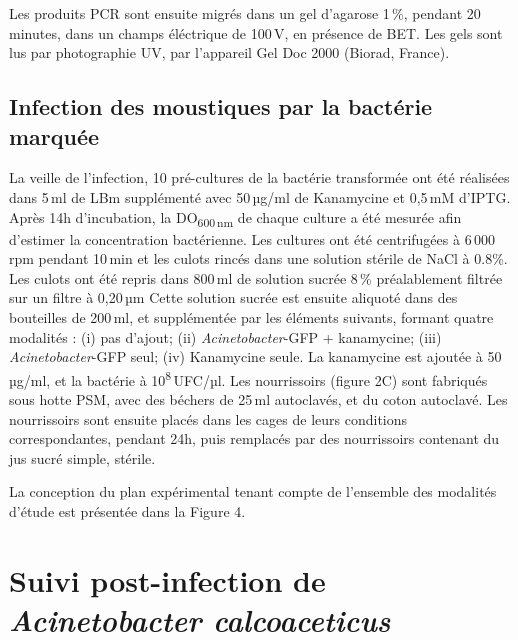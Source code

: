 Les produits PCR sont ensuite migrés dans un gel d'agarose 1\,\%, pendant 20 minutes, dans un champs éléctrique de 100\,V, en présence de BET.
Les gels sont lus par photographie UV, par l'appareil Gel Doc 2000 (Biorad, France).

\subsection{Infection des moustiques par la bactérie marquée}

La veille de l’infection, 10 pré-cultures de la bactérie transformée ont été réalisées dans 5\,ml de LBm supplémenté avec 50\,µg/ml de Kanamycine et 0,5\,mM d'IPTG.
Après 14h d'incubation, la DO\textsubscript{600\,nm} de chaque culture a été mesurée afin d'estimer la concentration bactérienne.
Les cultures ont été centrifugées à 6\,000\,rpm pendant 10\,min et les culots rincés dans une solution stérile de NaCl à 0.8\%.
Les culots ont été repris dans 800\,ml de solution sucrée 8\,\% préalablement filtrée sur un filtre à 0,20\,µm
Cette solution sucrée est ensuite aliquoté dans des bouteilles de 200\,ml, et supplémentée par les éléments suivants, formant quatre modalités :
(i) pas d'ajout; (ii) \textit{Acinetobacter}-GFP + kanamycine; (iii) \textit{Acinetobacter}-GFP seul; (iv) Kanamycine seule.
La kanamycine est ajoutée à 50\,µg/ml, et la bactérie à 10\textsuperscript{8}\,UFC/µl.
Les nourrissoirs (figure 2C) sont fabriqués sous hotte PSM, avec des béchers de 25\,ml autoclavés, et du coton autoclavé.
Les nourrissoirs sont ensuite placés dans les cages de leurs conditions correspondantes, pendant 24h, puis remplacés par des nourrissoirs contenant du jus sucré simple, stérile.


La conception du plan expérimental tenant compte de l’ensemble des modalités d’étude est présentée dans la Figure 4.

\section{Suivi post-infection de \textit{Acinetobacter calcoaceticus}}

